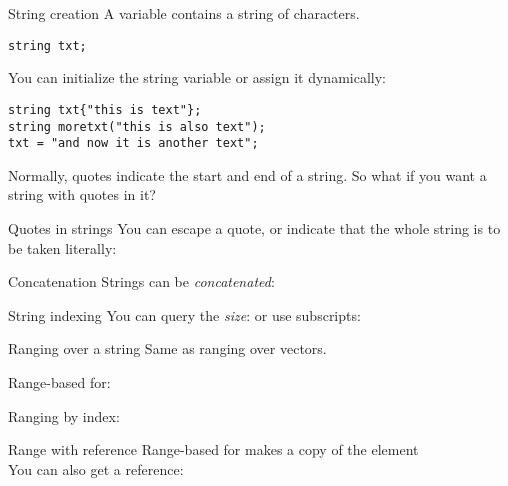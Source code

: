 \begin{block}{String creation}
  \label{sl:string-create}
  A  variable contains a string of characters.
\begin{lstlisting}
string txt;
\end{lstlisting}
You can initialize the string variable or assign it dynamically:
\begin{lstlisting}
string txt{"this is text"};
string moretxt("this is also text");
txt = "and now it is another text";
\end{lstlisting}
\end{block}

Normally, quotes indicate the start and end of a string. So what if
you want a string with quotes in it?

\begin{block}{Quotes in strings}
  \label{sl:string-quote}
  You can escape a quote, or indicate that the whole string is to be
  taken literally:
\end{block}

\begin{block}{Concatenation}
  \label{sl:string-plus}
  Strings can be \emph{concatenated}:
\end{block}

\begin{block}{String indexing}
  \label{sl:string-vector}
  You can query the \emph{size}:
  or use subscripts:
\end{block}

\begin{block}{Ranging over a string}
  \label{sl:string-index}
  Same as ranging over vectors.

  Range-based for:

  Ranging by index:

\end{block}

\begin{block}{Range with reference}
  \label{sl:string-index-ref}
  Range-based for makes a copy of the element\\
  You can also get a reference:
\end{block}

